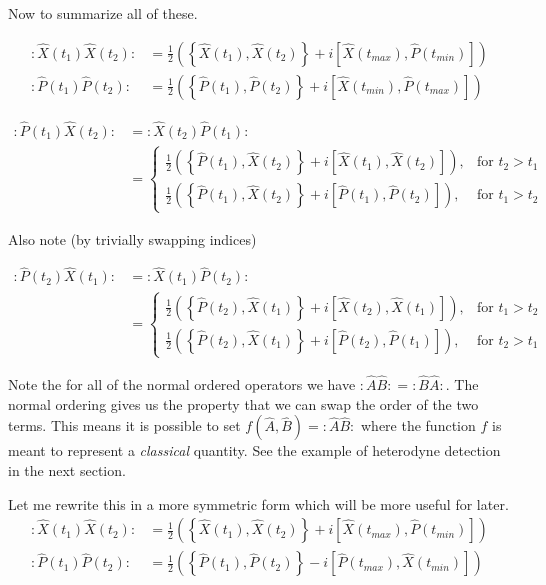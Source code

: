 \documentclass[12pt]{article}
\begin{document}
\pagebreak

Now to summarize all of these.

\begin{align}
:\hat{X}(t_1)\hat{X}(t_2): &= \frac{1}{2}\left(\left\{\hat{X}(t_1),\hat{X}(t_2)\right\} + i \left[\hat{X}(t_{max}),\hat{P}(t_{min})\right]\right)\\
:\hat{P}(t_1)\hat{P}(t_2): &= \frac{1}{2}\left(\left\{\hat{P}(t_1),\hat{P}(t_2)\right\} + i \left[\hat{X}(t_{min}),\hat{P}(t_{max})\right]\right)
\end{align}

\begin{align}
:\hat{P}(t_1)\hat{X}(t_2): &= :\hat{X}(t_2)\hat{P}(t_1):\\
&= 
\begin{cases}
\frac{1}{2}\left(\left\{\hat{P}(t_1),\hat{X}(t_2)\right\} + i \left[\hat{X}(t_1),\hat{X}(t_2)\right]\right), &\text{for } t_2>t_1\\
\frac{1}{2}\left(\left\{\hat{P}(t_1),\hat{X}(t_2)\right\} + i \left[\hat{P}(t_1),\hat{P}(t_2)\right]\right), &\text{for } t_1>t_2
\end{cases}
\end{align}

Also note (by trivially swapping indices)

\begin{align}
:\hat{P}(t_2)\hat{X}(t_1): &= :\hat{X}(t_1)\hat{P}(t_2):\\
&= 
\begin{cases}
\frac{1}{2}\left(\left\{\hat{P}(t_2),\hat{X}(t_1)\right\} + i \left[\hat{X}(t_2),\hat{X}(t_1)\right]\right), &\text{for } t_1>t_2\\
\frac{1}{2}\left(\left\{\hat{P}(t_2),\hat{X}(t_1)\right\} + i \left[\hat{P}(t_2),\hat{P}(t_1)\right]\right), &\text{for } t_2>t_1
\end{cases}
\end{align}

Note the for all of the normal ordered operators we have $:\hat{A}\hat{B}: = :\hat{B}\hat{A}:$. The normal ordering gives us the property that we can swap the order of the two terms. This means it is possible to set $f(\hat{A},\hat{B}) = :\hat{A}\hat{B}:$ where the function $f$ is meant to represent a \textit{classical} quantity. See the example of heterodyne detection in the next section.

Let me rewrite this in a more symmetric form which will be more useful for later. 
\begin{align}
:\hat{X}(t_1)\hat{X}(t_2): &= \frac{1}{2}\left(\left\{\hat{X}(t_1),\hat{X}(t_2)\right\} + i \left[\hat{X}(t_{max}),\hat{P}(t_{min})\right]\right)\\
:\hat{P}(t_1)\hat{P}(t_2): &= \frac{1}{2}\left(\left\{\hat{P}(t_1),\hat{P}(t_2)\right\} - i \left[\hat{P}(t_{max}),\hat{X}(t_{min})\right]\right)
\end{align}
\end{document}
